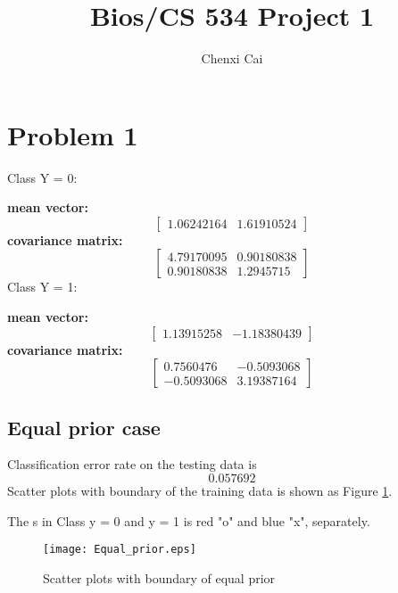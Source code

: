 \documentclass{article}
\title{ Bios/CS 534 Project 1}
\author{Chenxi Cai}
\begin{document}
\maketitle
\section{Problem 1}
Class Y = 0:

\textbf{mean vector:}
\begin{equation}
		\begin{bmatrix}
1.06242164  & 1.61910524
			\end{bmatrix}
			\end{equation}
\textbf{covariance matrix:}
		\begin{equation}
		\begin{bmatrix}
4.79170095 & 0.90180838 \\
0.90180838 & 1.2945715 
			\end{bmatrix}
			\end{equation}
Class Y = 1:

\textbf{mean vector:}
\begin{equation}
		\begin{bmatrix}
1.13915258 &  -1.18380439
			\end{bmatrix}
			\end{equation}
\textbf{covariance matrix:}
		\begin{equation}
		\begin{bmatrix}
0.7560476 &  -0.5093068 \\
-0.5093068 &  3.19387164
			\end{bmatrix}
			\end{equation}

	\subsection{Equal prior case}
Classification error rate on the testing data is
			 \begin{equation}
				0.057692
				\end{equation}
Scatter plots with boundary  of the training data is shown as Figure \ref{fig:equal_prior}.

The s in Class y = 0 and y = 1 is red "o" and  blue "x", separately.
\begin{figure}[!hbp]
    		\texttt{[image: Equal\_prior.eps]}
		\centering
		\caption{Scatter plots with boundary of equal prior}
		\label{fig:equal_prior}
    		\end{figure}
\end{document}

